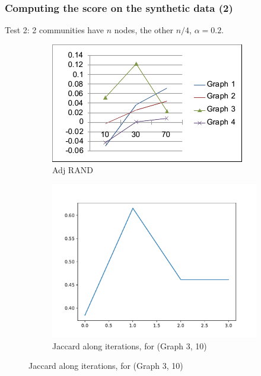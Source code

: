 \documentclass{beamer}
\begin{document}
\begin{frame}[c]
	\frametitle{Computing the score on the synthetic data (2)}
    Test 2: 2 communities have $n$ nodes, the other $n/4$, $\alpha = 0.2$.

    \begin{figure}
        \begin{center}
            \begin{subfigure}[b]{0.4\textwidth}
                \centering
                \includegraphics[width=\textwidth]{img/model_2run.png}
                \caption{Adj RAND}
                \label{fig:img/model_1run.png}
            \end{subfigure}
            \begin{subfigure}[b]{0.4\textwidth}
                \centering
                \includegraphics[width=\textwidth]{out/synthetic2/model1_scores6_10.pdf}
                \caption{Jaccard along iterations, for (Graph 3, 10)}
                \label{fig:}
            \end{subfigure}
        \end{center}
        \end{figure}
\end{frame}
\end{document}
